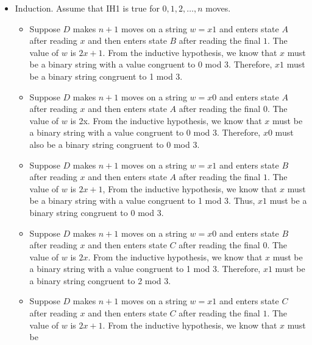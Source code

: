 \documentclass[]{article}
\begin{document}
\begin{enumerate}
\begin{itemize}
\begin{enumerate}
\begin{itemize}
                \item Induction. Assume that IH1 is true for 
                $0, 1, 2, \ldots, n$ moves.
                  \begin{itemize}
                    \item Suppose $D$ makes $n + 1$ moves on a string $w = x1$ 
                    and enters state $A$ after reading $x$ and then enters state 
                    $B$ after reading the final $1$. The value of $w$ is $2x + 
                    1$. From the inductive hypothesis, we know that $x$ must be 
                    a binary string with a value congruent to 0 mod 3. 
                    Therefore, $x1$ must be a binary string congruent to 1 mod 
                    3.
                    \item Suppose $D$ makes $n + 1$ moves on a string $w = x0$ 
                    and enters state $A$ after reading $x$ and then enters state
                    $A$ after reading the final $0$. The value of $w$ is 2x. 
                    From the inductive hypothesis, we know that $x$ must be a 
                    binary string with a value congruent to 0 mod 3. Therefore, 
                    $x0$ must also be a binary string congruent to 0 mod 3.
                    \item Suppose $D$ makes $n + 1$ moves on a string $w = x1$ 
                    and enters state $B$ after reading $x$ and then enters state 
                    $A$ after reading the final $1$. The value of $w$ is $2x + 
                    1$, From the inductive hypothesis, we know that $x$ must be 
                    a binary string with a value congruent to 1 mod 3. Thus, 
                    $x1$ must be a binary string congruent to 0 mod 3.
                    \item Suppose $D$ makes $n + 1$ moves on a string $w = x0$ 
                    and enters state $B$ after reading $x$ and then enters state 
                    $C$ after reading the final $0$. The value of $w$ is $2x$. 
                    From the inductive hypothesis, we know that $x$ must be a 
                    binary string with a value congruent to 1 mod 3. Therefore, 
                    $x1$ must be a binary string congruent to 2 mod 3.
                    \item Suppose $D$ makes $n + 1$ moves on a string $w = x1$ 
                    and enters state $C$ after reading $x$ and then enters state 
                    $C$ after reading the final $1$. The value of $w$ is $2x + 
                    1$. From the inductive hypothesis, we know that $x$ must be 

\end{itemize}
\end{itemize}
\end{enumerate}
\end{itemize}
\end{enumerate}
\end{document}
